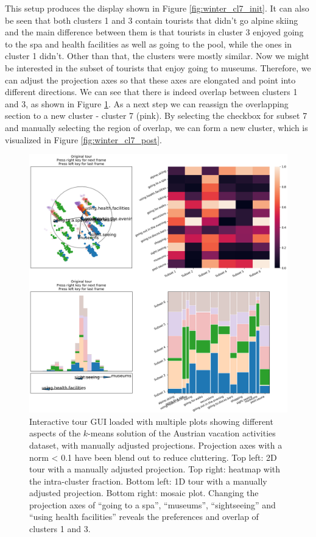 \documentclass[article]{ajs}
\begin{document}
This setup produces the display shown in Figure \ref{fig:winter_cl7_init}. It can also be seen that both clusters 1 and 3 contain tourists that didn't go alpine skiing and the main difference between them is that tourists in cluster 3 enjoyed going to the spa and health facilities as well as going to the pool, while the ones in cluster 1 didn't. Other than that, the clusters were mostly similar. Now we might be interested in the subset of tourists that enjoy going to museums. Therefore, we can adjust the projection axes so that these axes are elongated and point into different directions. We can see that there is indeed overlap between clusters 1 and 3, as shown in Figure \ref{fig:winter_cl7_pre}. As a next step we can reassign the overlapping section to a new cluster - cluster 7 (pink). By selecting the checkbox for subset 7 and manually selecting the region of overlap, we can form a new cluster, which is visualized in Figure \ref{fig:winter_cl7_post}.

\begin{figure}[h!]
    \centering
    \includegraphics[width=1\textwidth]{winter_cl7_pre.png}
    \caption{Interactive tour GUI loaded with multiple plots showing different aspects of the $k$-means solution of the Austrian vacation activities dataset, with manually adjusted projections. Projection axes with a norm < 0.1 have been blend out to reduce cluttering. Top left: 2D tour with a manually adjusted projection. Top right: heatmap with the intra-cluster fraction. Bottom left: 1D tour with a manually adjusted projection. Bottom right: mosaic plot. Changing the projection axes of ``going to a spa'', ``museums'', ``sightseeing'' and ``using health facilities'' reveals the preferences and overlap of clusters 1 and 3.}
    \label{fig:winter_cl7_pre}
\end{figure}
\end{document}
